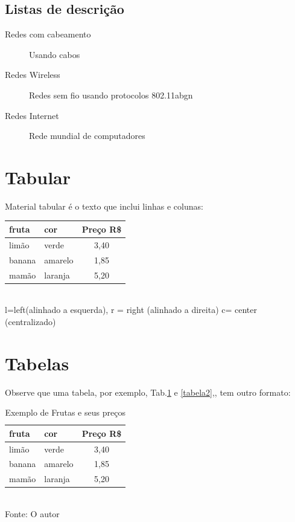     \subsection{Listas de descri\c{c}\~{a}o}

       \begin{description}
       	\item[Redes com cabeamento] Usando cabos
       	\item[Redes Wireless] Redes sem fio usando protocolos 802.11abgn
       	\item[Redes Internet] Rede mundial de computadores
       \end{description}











\section{Tabular}
Material tabular \'{e} o texto que inclui linhas e colunas: \\
\begin{tabular}{llc}
	fruta & cor  & Pre\c{c}o R\$ \\
	\hline
	lim\~{a}o & verde &  3,40 \\
	banana& amarelo & 1,85 \\
	mam\~{a}o & laranja & 5,20
\end{tabular}\\
l=left(alinhado a esquerda), r = right (alinhado a direita) c= center (centralizado)




\section{Tabelas}
Observe que uma tabela, por exemplo, Tab.\ref{tabela} e \ref{tabela2},,   tem outro formato:

\begin{table}[H]     %
	\centering
	\caption{Exemplo de Frutas e seus pre\c{c}os} 	\label{tabela}
	\begin{tabular}{llc}
		fruta & cor  & Pre\c{c}o R\$ \\        %
		\hline
		lim\~{a}o & verde &  3,40 \\
		banana& amarelo & 1,85 \\
		mam\~{a}o & laranja & 5,20
	\end{tabular}\\
    {\small Fonte: O autor}
\end{table}

